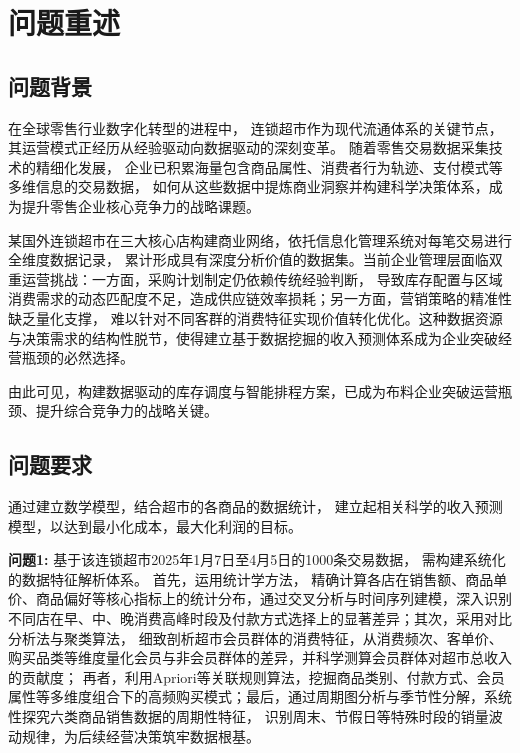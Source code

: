 \documentclass[withoutpreface,bwprint]{cumcmthesis}
\begin{document}

\section{问题重述}
\subsection{问题背景}
在全球零售行业数字化转型的进程中，
连锁超市作为现代流通体系的关键节点，
其运营模式正经历从经验驱动向数据驱动的深刻变革。
随着零售交易数据采集技术的精细化发展，
企业已积累海量包含商品属性、消费者行为轨迹、支付模式等多维信息的交易数据，
如何从这些数据中提炼商业洞察并构建科学决策体系，成为提升零售企业核心竞争力的战略课题。  
\par 某国外连锁超市在三大核心店构建商业网络，依托信息化管理系统对每笔交易进行全维度数据记录，
累计形成具有深度分析价值的数据集。当前企业管理层面临双重运营挑战：一方面，采购计划制定仍依赖传统经验判断，
导致库存配置与区域消费需求的动态匹配度不足，造成供应链效率损耗；另一方面，营销策略的精准性缺乏量化支撑，
难以针对不同客群的消费特征实现价值转化优化。这种数据资源与决策需求的结构性脱节，使得建立基于数据挖掘的收入预测体系成为企业突破经营瓶颈的必然选择。  
\par 由此可见，构建数据驱动的库存调度与智能排程方案，已成为布料企业突破运营瓶颈、提升综合竞争力的战略关键。



\subsection{问题要求}
通过建立数学模型，结合超市的各商品的数据统计，
建立起相关科学的收入预测模型，以达到最小化成本，最大化利润的目标。
\par

\textbf{问题1:}  
基于该连锁超市2025年1月7日至4月5日的1000条交易数据，
需构建系统化的数据特征解析体系。
首先，运用统计学方法，
精确计算各店在销售额、商品单价、商品偏好等核心指标上的统计分布，通过交叉分析与时间序列建模，深入识别不同店在早、中、晚消费高峰时段及付款方式选择上的显著差异；其次，采用对比分析法与聚类算法，
细致剖析超市会员群体的消费特征，从消费频次、客单价、购买品类等维度量化会员与非会员群体的差异，并科学测算会员群体对超市总收入的贡献度；
再者，利用Apriori等关联规则算法，挖掘商品类别、付款方式、会员属性等多维度组合下的高频购买模式；最后，通过周期图分析与季节性分解，系统性探究六类商品销售数据的周期性特征，
识别周末、节假日等特殊时段的销量波动规律，为后续经营决策筑牢数据根基。
\par
\end{document}

